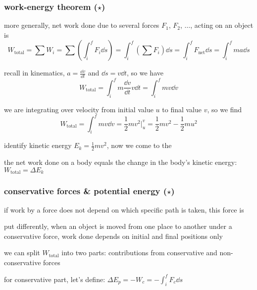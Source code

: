 \subsubsection{work-energy theorem ($\star$)}

more generally, net work done due to several forces $F_1$, $F_2$, $\dots$, acting on an object is
\begin{equation*}
W_\text{total} = \sum W_i = \sum \left(\int_i^f F_i \dd s\right) = \int_i^f \left(\sum F_i \right)\dd s = \int_i^f F_\text{net} \dd s = \int_i^f ma \dd s
\end{equation*}

recall in kinematics, $a=\frac{\dd v}{\dd t}$ and $\dd s = v \dd t$, so we have
\begin{equation*}
W_\text{total} = \int_i^f m \frac{\dd v}{\dd t} v \dd t = \int_i^f m v \dd v
\end{equation*}

we are integrating over velocity from initial value $u$ to final value $v$, so we find
\begin{equation*}
W_\text{total} = \int_i^f m v \dd v = \frac{1}{2}mv^2 \Big|_u^v = \frac{1}{2}mv^2 - \frac{1}{2}mu^2
\end{equation*}

identify kinetic energy $E_k = \frac{1}{2}mv^2$, now we come to the   

\begin{ilight}
	the net work done on a body equals the change in the body's kinetic energy: $\boxed{W_\text{total} = \Delta E_k}$
\end{ilight}



\subsubsection{conservative forces \& potential energy ($\star$)}


if work by a force does not depend on which specific path is taken, this force is 

put differently, when an object is moved from one place to another under a conservative force, work done depends on initial and final positions only

we can split $W_\text{total}$ into two parts: contributions from conservative and non-conservative forces

for conservative part, let's define: $\Delta E_p = - W_{c} = - \int_i^f F_c \dd s $

